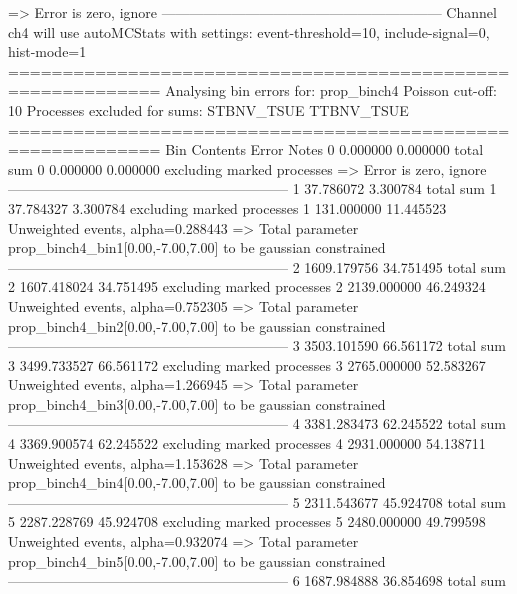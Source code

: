   => Error is zero, ignore      
------------------------------------------------------------
Channel ch4 will use autoMCStats with settings: event-threshold=10, include-signal=0, hist-mode=1
============================================================
Analysing bin errors for: prop_binch4
Poisson cut-off: 10
Processes excluded for sums: STBNV_TSUE TTBNV_TSUE
============================================================
Bin        Contents        Error           Notes                         
0          0.000000        0.000000        total sum                     
0          0.000000        0.000000        excluding marked processes    
  => Error is zero, ignore      
------------------------------------------------------------
1          37.786072       3.300784        total sum                     
1          37.784327       3.300784        excluding marked processes    
1          131.000000      11.445523       Unweighted events, alpha=0.288443
  => Total parameter prop_binch4_bin1[0.00,-7.00,7.00] to be gaussian constrained
------------------------------------------------------------
2          1609.179756     34.751495       total sum                     
2          1607.418024     34.751495       excluding marked processes    
2          2139.000000     46.249324       Unweighted events, alpha=0.752305
  => Total parameter prop_binch4_bin2[0.00,-7.00,7.00] to be gaussian constrained
------------------------------------------------------------
3          3503.101590     66.561172       total sum                     
3          3499.733527     66.561172       excluding marked processes    
3          2765.000000     52.583267       Unweighted events, alpha=1.266945
  => Total parameter prop_binch4_bin3[0.00,-7.00,7.00] to be gaussian constrained
------------------------------------------------------------
4          3381.283473     62.245522       total sum                     
4          3369.900574     62.245522       excluding marked processes    
4          2931.000000     54.138711       Unweighted events, alpha=1.153628
  => Total parameter prop_binch4_bin4[0.00,-7.00,7.00] to be gaussian constrained
------------------------------------------------------------
5          2311.543677     45.924708       total sum                     
5          2287.228769     45.924708       excluding marked processes    
5          2480.000000     49.799598       Unweighted events, alpha=0.932074
  => Total parameter prop_binch4_bin5[0.00,-7.00,7.00] to be gaussian constrained
------------------------------------------------------------
6          1687.984888     36.854698       total sum                     
